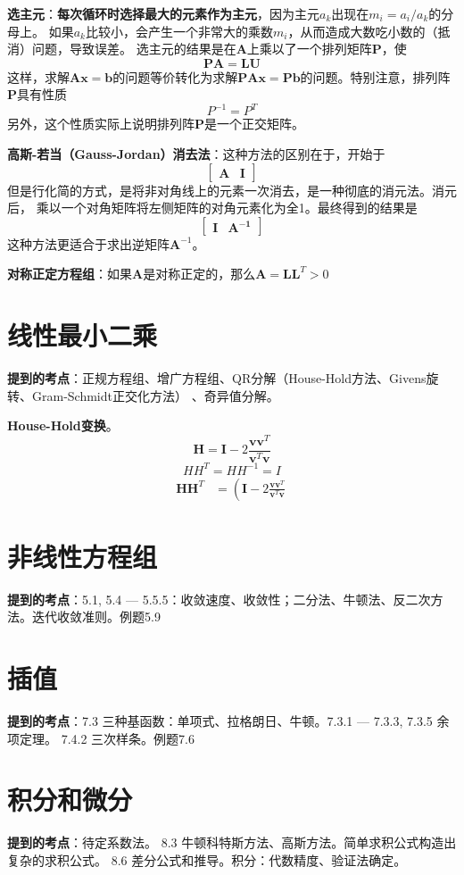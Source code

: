 \documentclass[14pt, letterpaper, UTF8, fontset=windowsnew, heading=true]{article}
\begin{document}
\par
\textbf{选主元}：\textbf{每次循环时选择最大的元素作为主元}，因为主元$a_k$出现在$m_i=a_i/a_k$的分母上。
如果$a_k$比较小，会产生一个非常大的乘数$m_i$，从而造成大数吃小数的（抵消）问题，导致误差。
选主元的结果是在$\bm{A}$上乘以了一个排列矩阵$\bm{P}$，使
$$\bm{PA}=\bm{LU}$$
这样，求解$\bm{Ax}=\bm{b}$的问题等价转化为求解$\bm{PAx}=\bm{Pb}$的问题。特别注意，排列阵$\bm{P}$具有性质
$$P^{-1}=P^T$$
另外，这个性质实际上说明排列阵$\bm{P}$是一个正交矩阵。

\par
\textbf{高斯-若当（Gauss-Jordan）消去法}：这种方法的区别在于，开始于
$$\left[\begin{array}{c|c} \bm{A} &\bm{I} \end{array}\right]$$
但是行化简的方式，是将非对角线上的元素一次消去，是一种彻底的消元法。消元后，
乘以一个对角矩阵将左侧矩阵的对角元素化为全1。最终得到的结果是
$$\left[\begin{array}{c|c} \bm{I} &\bm{A^{-1}} \end{array}\right]$$
这种方法更适合于求出逆矩阵$\bm{A}^{-1}$。

\par
\textbf{对称正定方程组}：如果$\bm{A}$是对称正定的，那么$\bm{A}=\bm{LL}^T>0$

\part{线性最小二乘}

\textbf{提到的考点}：正规方程组、增广方程组、QR分解（House-Hold方法、Givens旋转、Gram-Schmidt正交化方法）
、奇异值分解。

\textbf{House-Hold变换}。
$$\bm{H} = \bm{I} - 2\frac{\bm{vv}^T}{\bm{v}^T\bm{v}}$$
$$HH^T=HH^{-1}=I$$
$$\begin{aligned}
\bm{HH}^T &= \left(\bm{I} - 2\frac{\bm{vv}^T}{\bm{v}^T\bm{v}}\
\end{aligned}$$

\part{非线性方程组}

\textbf{提到的考点}：5.1, 5.4 --- 5.5.5：收敛速度、收敛性；二分法、牛顿法、反二次方法。迭代收敛准则。例题5.9

\part{插值}

\textbf{提到的考点}：7.3 三种基函数：单项式、拉格朗日、牛顿。7.3.1 --- 7.3.3, 7.3.5 余项定理。
7.4.2 三次样条。例题7.6

\part{积分和微分}

\textbf{提到的考点}：待定系数法。 8.3 牛顿科特斯方法、高斯方法。简单求积公式构造出复杂的求积公式。
8.6 差分公式和推导。积分：代数精度、验证法确定。
	
\end{document}
